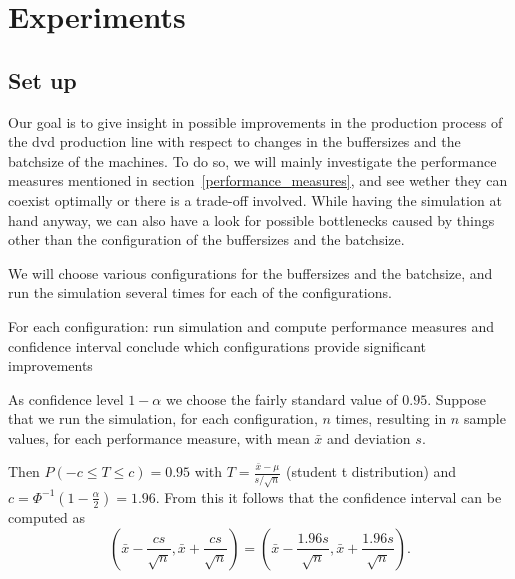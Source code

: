 \documentclass{article}
\begin{document}








\section{Experiments}
%
\subsection{Set up}
Our goal is to give insight in possible improvements in the production process of the dvd production line with respect to changes in the buffersizes and the batchsize of the machines.
To do so, we will mainly investigate the performance measures mentioned in section~\ref{performance_measures}, and see wether they can coexist optimally or there is a trade-off involved.
While having the simulation at hand anyway, we can also have a look for possible bottlenecks caused by things other than the configuration of the buffersizes and the batchsize.

We will choose various configurations for the buffersizes and the batchsize, and run the simulation several times for each of the configurations.

For each configuration:
    run simulation and compute performance measures and confidence interval
    conclude which configurations provide significant improvements


As confidence level $1 - \alpha$ we choose the fairly standard value of $0.95$.
Suppose that we run the simulation, for each configuration, $n$ times, resulting in $n$ sample values, for each performance measure, with mean $\bar{x}$ and deviation $s$.

Then $P(-c \leq T \leq c) = 0.95 $ with $T = \frac{\bar{x} - \mu}{s/\sqrt{n}}$ (student t distribution) and $c = \Phi ^{-1} (1 - \frac{\alpha}{2})= 1.96$.
From this it follows that the confidence interval can be computed as
\[ (\bar{x} - \frac{cs}{\sqrt{n}}, \bar{x} + \frac{cs}{\sqrt{n}}) =
(\bar{x} - \frac{1.96s}{\sqrt{n}}, \bar{x} + \frac{1.96s}{\sqrt{n}}). \]
\end{document}
